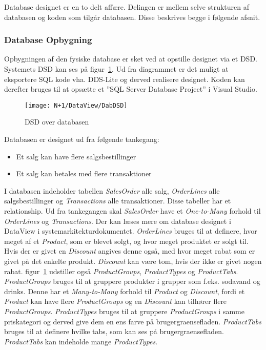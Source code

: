 Database designet er en to delt affære. Delingen er mellem selve strukturen af databasen og koden som tilgår databasen.
Disse beskrives begge i følgende afsnit.

\subsubsection{Database Opbygning}
Opbygningen af den fysiske database er sket ved at opstille designet via et \gls{DSD}. Systemets \gls{DSD}  kan ses på figur~\ref{fig:DSD}. Ud fra diagrammet er det muligt at eksportere SQL kode vha. \gls{DDS-Lite} og derved realisere designet. Koden kan derefter bruges til at opsætte et ''SQL Server Database Project'' i Visual Studio. 

\begin{figure}[H]
    \centering
    \texttt{[image: N+1/DataView/DabDSD]}
    \caption{\gls{DSD} over databasen}
    \label{fig:DSD}
\end{figure}

Databasen er designet ud fra følgende tankegang:
\begin{itemize}
	\item Et salg kan have flere salgsbestillinger
	\item Et salg kan betales med flere transaktioner
\end{itemize}
I databasen indeholder tabellen \textit{SalesOrder} alle salg, \textit{OrderLines} alle salgsbestillinger og \textit{Transactions} alle transaktioner. Disse tabeller har et relationship. Ud fra tankegangen skal \textit{SalesOrder} have et \textit{One-to-Many} forhold til \textit{OrderLines} og \textit{Transactions}. Der kan læses mere om database designet i DataView i systemarkitekturdokumentet.
\newline\newline
\textit{OrderLines} bruges til at definere, hvor meget af et \textit{Product}, som er blevet solgt, og hvor meget produktet er solgt til. Hvis der er givet en \textit{Discount} angives denne også, med hvor meget rabat som er givet på det enkelte produkt. \textit{Discount} kan være tom, hvis der ikke er givet nogen rabat.
\newline\newline
figur~\ref{fig:DSD} udstiller også \textit{ProductGroups}, \textit{ProductTypes} og \textit{ProductTabs}. \textit{ProductGroups} bruges til at gruppere produkter i grupper som f.eks. sodavand og drinks. Denne har et \textit{Many-to-Many} forhold til \textit{Product} og \textit{Discount}, fordi et \textit{Product} kan have flere \textit{ProductGroups} og en \textit{Discount} kan tilhører flere \textit{ProductGroups}. \textit{ProductTypes} bruges til at gruppere \textit{ProductGroups} i samme priskategori og derved give dem en ens farve på \gls{brugergraenseflade}n. \textit{ProductTabs} bruges til at definere hvilke tabs, som kan ses på \gls{brugergraenseflade}n. \textit{ProductTabs} kan indeholde mange \textit{ProductTypes}.

